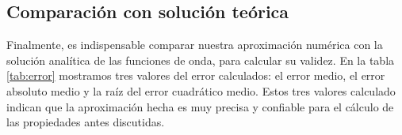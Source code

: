 \documentclass[12pt,twoside]{extarticle}
\begin{document}
\begin{table}[h!]
    \centering
    \caption{Probabilidad de encontrar a la partícula en cuatro rangos de interés. [0-0.5] $a_0$, [0-0.25] $a_0$, [0.45-0.55] $a_0$ y una bola con radio de la distribución standar centrada en la media.}
    \label{tab:prop}
\end{table}

\subsection{Comparación con solución teórica}
Finalmente, es indispensable comparar nuestra aproximación numérica con la solución analítica de las funciones de onda, para calcular su validez. En la tabla \ref{tab:error} mostramos tres valores del error calculados: el error medio, el error absoluto medio y la raíz del error cuadrático medio. Estos tres valores calculado indican que la aproximación hecha es muy precisa y confiable para el cálculo de las propiedades antes discutidas.

\begin{table}[ht]
    \centering
    \caption{Error del calculo experimental comparado con la solución teórica sinusoidal del problema.}
    \label{tab:error}
\end{table}
\end{document}
